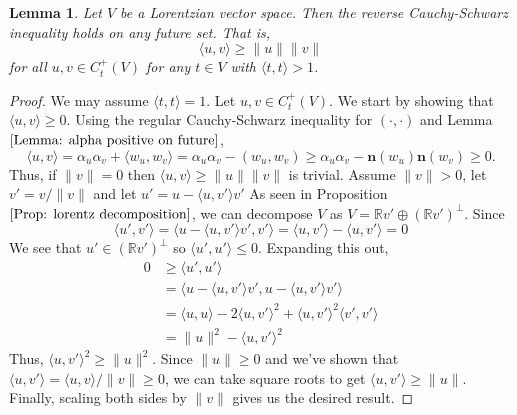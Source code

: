 \documentclass[a4paper,11pt]{article}
\numberwithin{equation}{section}
\theoremstyle{definition}
\theoremstyle{plain}
\newtheorem{Lemma}[Definition]{Lemma}
\newcommand{\R}{\mathbb R}
\newcommand{\inner}[2]{\langle #1, #2 \rangle}
\newcommand{\norm}[1]{\| #1\|}
\begin{document}
\begin{Lemma}
    Let $V$ be a Lorentzian vector space. Then the reverse Cauchy-Schwarz inequality holds on any future set. That is,
    $$\inner{u}{v} \geq \norm{u}\norm{v}$$
    for all $u, v \in C_t^{+}(V)$ for any $t \in V$ with $\inner{t}{t} > 1$.
\end{Lemma}
\begin{proof}
    We may assume $\inner{t}{t} = 1$. Let $u, v \in C_{t}^{+}(V)$. We start by showing that $\inner{u}{v} \geq 0$. 
    Using the regular Cauchy-Schwarz inequality for $(\cdot, \cdot)$ and Lemma $\ref{Lemma: alpha positive on future}$,
    $$\inner{u}{v} = \alpha_{u}\alpha_{v} + \inner{w_{u}}{w_{v}} = \alpha_{u}\alpha_{v} - (w_{u}, w_{v}) \geq \alpha_{u}\alpha_{v} - \mathbf{n}(w_{u})\mathbf{n}(w_{v}) \geq 0.$$
    Thus, if $\norm{v} = 0$ then $\inner{u}{v} \geq \norm{u}\norm{v}$ is trivial. Assume $\norm{v} > 0$, let $v' = v/\norm{v}$ and let $u' = u - \inner{u}{v'}v'$
    As seen in Proposition $\ref{Prop: lorentz decomposition}$, we can decompose $V$ as $V = \R v' \oplus (\R v')^{\perp}$. Since
    $$\inner{u'}{v'} = \inner{u - \inner{u}{v'}v'}{v'} = \inner{u}{v'} - \inner{u}{v'} = 0$$
    We see that $u' \in (\R v')^{\perp}$ so $\inner{u'}{u'} \leq 0$. Expanding this out,
    \begin{align*}
        0 &\geq \inner{u'}{u'} \\
        &= \inner{u - \inner{u}{v'}v'}{u - \inner{u}{v'}v'} \\
        &= \inner{u}{u} - 2\inner{u}{v'}^{2} + \inner{u}{v'}^{2}\inner{v'}{v'}\\
        &= \norm{u}^{2} - \inner{u}{v'}^{2}
    \end{align*}
    Thus, $\inner{u}{v'}^{2} \geq \norm{u}^{2}$. Since $\norm{u} \geq 0$ and we've shown that $\inner{u}{v'} = \inner{u}{v}/\norm{v} \geq 0$, we can take square roots to get $\inner{u}{v'} \geq \norm{u}$. Finally, scaling both sides by $\norm{v}$ gives us the desired result.
\end{proof}
\end{document}
